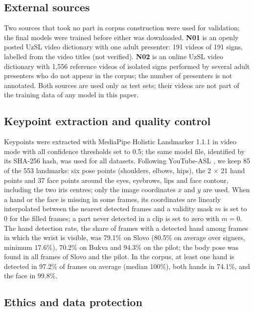 \documentclass[a4paper,fleqn]{cas-dc}
\begin{document}
\hypertarget{external-sources}{%
\subsection{External sources}\label{external-sources}}

Two sources that took no part in corpus construction were used for validation; the final models were trained before either was downloaded. \textbf{N01} is an openly posted UzSL video dictionary with one adult presenter: 191 videos of 191 signs, labelled from the video titles (not verified). \textbf{N02} is an online UzSL video dictionary with 1,556 reference videos of isolated signs performed by several adult presenters who do not appear in the corpus; the number of presenters is not annotated. Both sources are used only as test sets; their videos are not part of the training data of any model in this paper.

\hypertarget{keypoint-extraction-and-quality-control}{%
\subsection{Keypoint extraction and quality control}\label{keypoint-extraction-and-quality-control}}

Keypoints were extracted with MediaPipe Holistic Landmarker 1.1.1 \cite{docs_mediapipe_holistic_landmarker} in video mode with all confidence thresholds set to 0.5; the same model file, identified by its SHA-256 hash, was used for all datasets. Following YouTube-ASL \cite{2023_uthus_youtube_asl}, we keep 85 of the 553 landmarks: six pose points (shoulders, elbows, hips), the 2 $\times$ 21 hand points and 37 face points around the eyes, eyebrows, lips and face contour, including the two iris centres; only the image coordinates \(x\) and \(y\) are used. When a hand or the face is missing in some frames, its coordinates are linearly interpolated between the nearest detected frames and a validity mask \(m\) is set to 0 for the filled frames; a part never detected in a clip is set to zero with \(m = 0\). The hand detection rate, the share of frames with a detected hand among frames in which the wrist is visible, was 79.1\% on Slovo (80.5\% on average over signers, minimum 17.6\%), 70.2\% on Bukva and 94.3\% on the pilot; the body pose was found in all frames of Slovo and the pilot. In the corpus, at least one hand is detected in 97.2\% of frames on average (median 100\%), both hands in 74.1\%, and the face in 99.8\%.

\hypertarget{ethics-and-data-protection}{%
\subsection{Ethics and data protection}\label{ethics-and-data-protection}}
\end{document}
